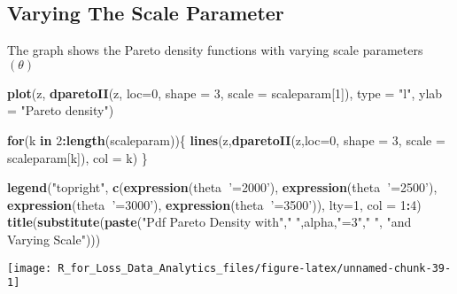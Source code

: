 \documentclass[]{book}
\newenvironment{Shaded}{\begin{snugshade}}{\end{snugshade}}
\newcommand{\KeywordTok}[1]{\textcolor[rgb]{0.13,0.29,0.53}{\textbf{#1}}}
\newcommand{\DataTypeTok}[1]{\textcolor[rgb]{0.13,0.29,0.53}{#1}}
\newcommand{\DecValTok}[1]{\textcolor[rgb]{0.00,0.00,0.81}{#1}}
\newcommand{\StringTok}[1]{\textcolor[rgb]{0.31,0.60,0.02}{#1}}
\newcommand{\ControlFlowTok}[1]{\textcolor[rgb]{0.13,0.29,0.53}{\textbf{#1}}}
\newcommand{\OperatorTok}[1]{\textcolor[rgb]{0.81,0.36,0.00}{\textbf{#1}}}
\newcommand{\NormalTok}[1]{#1}
\theoremstyle{definition}
\theoremstyle{definition}
\theoremstyle{definition}
\theoremstyle{remark}
\begin{document}
\subsection{Varying The Scale
Parameter}\label{varying-the-scale-parameter-1}

The graph shows the Pareto density functions with varying scale
parameters \((\theta)\)

\begin{Shaded}
\begin{Highlighting}[]
\KeywordTok{plot}\NormalTok{(z, }\KeywordTok{dparetoII}\NormalTok{(z, }\DataTypeTok{loc=}\DecValTok{0}\NormalTok{, }\DataTypeTok{shape =} \DecValTok{3}\NormalTok{, }\DataTypeTok{scale =}\NormalTok{ scaleparam[}\DecValTok{1}\NormalTok{]), }\DataTypeTok{type =} \StringTok{"l"}\NormalTok{, }\DataTypeTok{ylab =} \StringTok{"Pareto density"}\NormalTok{)}

\ControlFlowTok{for}\NormalTok{(k }\ControlFlowTok{in} \DecValTok{2}\OperatorTok{:}\KeywordTok{length}\NormalTok{(scaleparam))\{}
  \KeywordTok{lines}\NormalTok{(z,}\KeywordTok{dparetoII}\NormalTok{(z,}\DataTypeTok{loc=}\DecValTok{0}\NormalTok{, }\DataTypeTok{shape =} \DecValTok{3}\NormalTok{, }\DataTypeTok{scale =}\NormalTok{ scaleparam[k]), }\DataTypeTok{col =}\NormalTok{ k)}
\NormalTok{\}}

\KeywordTok{legend}\NormalTok{(}\StringTok{"topright"}\NormalTok{, }\KeywordTok{c}\NormalTok{(}\KeywordTok{expression}\NormalTok{(theta}\OperatorTok{~}\StringTok{'=2000'}\NormalTok{), }\KeywordTok{expression}\NormalTok{(theta}\OperatorTok{~}\StringTok{'=2500'}\NormalTok{), }\KeywordTok{expression}\NormalTok{(theta}\OperatorTok{~}\StringTok{'=3000'}\NormalTok{), }\KeywordTok{expression}\NormalTok{(theta}\OperatorTok{~}\StringTok{'=3500'}\NormalTok{)), }\DataTypeTok{lty=}\DecValTok{1}\NormalTok{, }\DataTypeTok{col =} \DecValTok{1}\OperatorTok{:}\DecValTok{4}\NormalTok{)}
\KeywordTok{title}\NormalTok{(}\KeywordTok{substitute}\NormalTok{(}\KeywordTok{paste}\NormalTok{(}\StringTok{"Pdf Pareto Density with"}\NormalTok{,}\StringTok{" "}\NormalTok{,alpha,}\StringTok{"=3"}\NormalTok{,}\StringTok{" "}\NormalTok{, }\StringTok{"and Varying Scale"}\NormalTok{)))}
\end{Highlighting}
\end{Shaded}

\begin{center}\texttt{[image: R\_for\_Loss\_Data\_Analytics\_files/figure-latex/unnamed-chunk-39-1]} \end{center}
\end{document}
